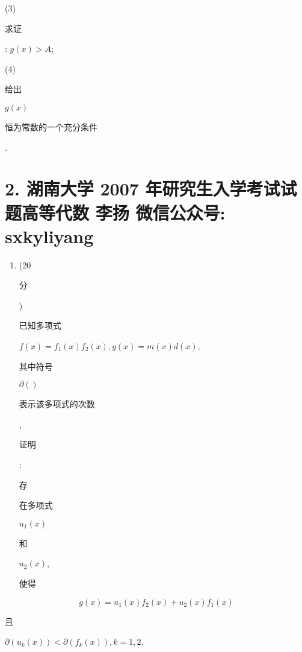 \documentclass[10pt]{article}
\begin{document}
(3) \begin{CJK}{UTF8}{mj}求证\end{CJK}: $g(x)>A$;

(4) \begin{CJK}{UTF8}{mj}给出\end{CJK} $g(x)$ \begin{CJK}{UTF8}{mj}恒为常数的一个充分条件\end{CJK}.

\section{2. 湖南大学 2007 年研究生入学考试试题高等代数 
 李扬 
 微信公众号: sxkyliyang}
\begin{enumerate}
  \item (20 \begin{CJK}{UTF8}{mj}分\end{CJK}) \begin{CJK}{UTF8}{mj}已知多项式\end{CJK} $f(x)=f_{1}(x) f_{2}(x), g(x)=m(x) d(x)$, \begin{CJK}{UTF8}{mj}其中符号\end{CJK} $\partial()$ \begin{CJK}{UTF8}{mj}表示该多项式的次数\end{CJK}, \begin{CJK}{UTF8}{mj}证明\end{CJK}: \begin{CJK}{UTF8}{mj}存\end{CJK} \begin{CJK}{UTF8}{mj}在多项式\end{CJK} $u_{1}(x)$ \begin{CJK}{UTF8}{mj}和\end{CJK} $u_{2}(x)$, \begin{CJK}{UTF8}{mj}使得\end{CJK}
\end{enumerate}
$$
g(x)=u_{1}(x) f_{2}(x)+u_{2}(x) f_{1}(x)
$$
\begin{CJK}{UTF8}{mj}且\end{CJK} $\partial\left(u_{k}(x)\right)<\partial\left(f_{k}(x)\right), k=1,2$.
\end{document}
